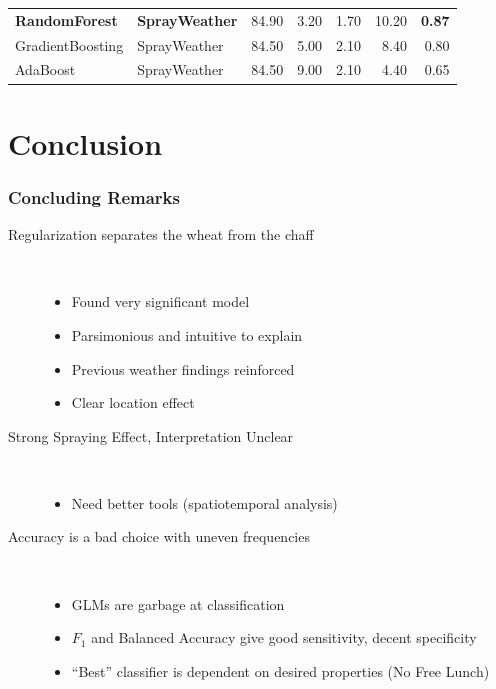 \documentclass[handout]{beamer}
\begin{document}
\begin{frame}
\begin{table}[H]
\begin{tabular}{|ll|rrrrr|}
  \bf{RandomForest} & \bf{SprayWeather} & 84.90 & 3.20 & 1.70 & 10.20 & \bf{0.87} \\ 
  GradientBoosting & SprayWeather & 84.50 & 5.00 & 2.10 & 8.40 & 0.80 \\ 
  AdaBoost & SprayWeather & 84.50 & 9.00 & 2.10 & 4.40 & 0.65 \\ \hline
\end{tabular}
\end{table}
\end{frame}

\section{Conclusion}
\begin{frame}
\frametitle{Concluding Remarks}
\begin{description}
\item[Regularization separates the wheat from the chaff]\
\begin{itemize}
\item Found very significant model
\item Parsimonious and intuitive to explain
\item Previous weather findings reinforced
\item Clear location effect
\end{itemize}
\item[Strong Spraying Effect, Interpretation Unclear]\
\begin{itemize}
\item Need better tools (spatiotemporal analysis)
\end{itemize}

\item[Accuracy is a bad choice with uneven frequencies]\
\begin{itemize}
\item GLMs are garbage at classification
\item $F_1$ and Balanced Accuracy give good sensitivity, decent specificity
\item ``Best'' classifier is dependent on desired properties (No Free Lunch)
\end{itemize}
\end{description}
\end{frame}
\end{document}

